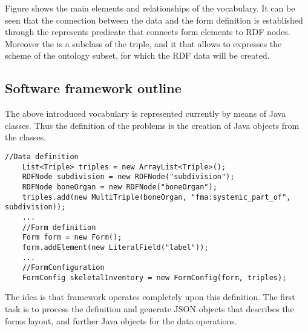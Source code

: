 

Figure  shows the main elements and relationships of the vocabulary. It can be seen that the connection between the data and the form definition is established through the represents predicate that connects form elements to RDF nodes. Moreover the  is a subclass of the triple, and it that allows to expresses the scheme of the ontology subset, for which the RDF data will be created.


\subsection{Software framework outline} \label{[332}


The above introduced vocabulary is represented currently by means of Java classes. Thus the definition of the problems is the creation of Java objects from the classes. 


\begin{lstlisting}[captionpos=b, caption=Input process definition in Java, label={dataDefinition},
basicstyle=\footnotesize,frame=single]
	//Data definition
	List<Triple> triples = new ArrayList<Triple>();
	RDFNode subdivision = new RDFNode("subdivision");
	RDFNode boneOrgan = new RDFNode("boneOrgan");
	triples.add(new MultiTriple(boneOrgan, "fma:systemic_part_of", subdivision));
	...
	//Form definition
	Form form = new Form();
	form.addElement(new LiteralField("label"));
	...
	//FormConfiguration
	FormConfig skeletalInventory = new FormConfig(form, triples);
\end{lstlisting}


The idea is that framework operates completely upon this definition. The first task is to process the definition and generate JSON objects that describes the forms layout, and further Java objects for the data operations.




